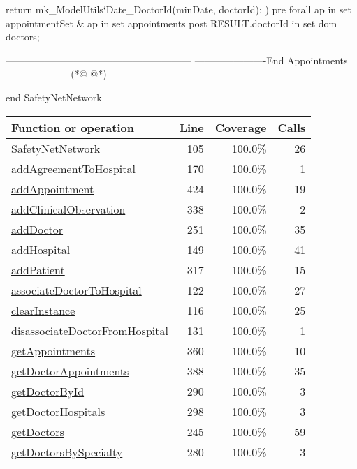 \begin{vdmpp}[breaklines=true]
   return mk_ModelUtils`Date_DoctorId(minDate, doctorId);
  )
  pre forall ap in set appointmentSet & ap in set appointments
  post RESULT.doctorId in set dom doctors;
  
   ---------------------------------------------------------
  ----------------------End Appointments-------------------
(*@
\label{getDoctorAppointments:388}
@*)
  ---------------------------------------------------------
  

end SafetyNetNetwork
\end{vdmpp}
\bigskip
\begin{longtable}{|l|r|r|r|}
\hline
Function or operation & Line & Coverage & Calls \\
\hline
\hline
\hyperref[SafetyNetNetwork:105]{SafetyNetNetwork} & 105&100.0\% & 26 \\
\hline
\hyperref[addAgreementToHospital:170]{addAgreementToHospital} & 170&100.0\% & 1 \\
\hline
\hyperref[addAppointment:424]{addAppointment} & 424&100.0\% & 19 \\
\hline
\hyperref[addClinicalObservation:338]{addClinicalObservation} & 338&100.0\% & 2 \\
\hline
\hyperref[addDoctor:251]{addDoctor} & 251&100.0\% & 35 \\
\hline
\hyperref[addHospital:149]{addHospital} & 149&100.0\% & 41 \\
\hline
\hyperref[addPatient:317]{addPatient} & 317&100.0\% & 15 \\
\hline
\hyperref[associateDoctorToHospital:122]{associateDoctorToHospital} & 122&100.0\% & 27 \\
\hline
\hyperref[clearInstance:116]{clearInstance} & 116&100.0\% & 25 \\
\hline
\hyperref[disassociateDoctorFromHospital:131]{disassociateDoctorFromHospital} & 131&100.0\% & 1 \\
\hline
\hyperref[getAppointments:360]{getAppointments} & 360&100.0\% & 10 \\
\hline
\hyperref[getDoctorAppointments:388]{getDoctorAppointments} & 388&100.0\% & 35 \\
\hline
\hyperref[getDoctorById:290]{getDoctorById} & 290&100.0\% & 3 \\
\hline
\hyperref[getDoctorHospitals:298]{getDoctorHospitals} & 298&100.0\% & 3 \\
\hline
\hyperref[getDoctors:245]{getDoctors} & 245&100.0\% & 59 \\
\hline
\hyperref[getDoctorsBySpecialty:280]{getDoctorsBySpecialty} & 280&100.0\% & 3 \\

\end{longtable}
